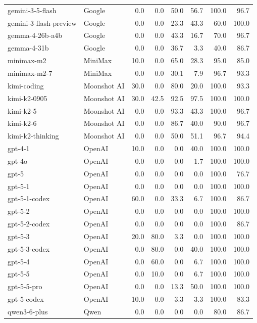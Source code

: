 \begin{longtable}{llrrrrrr}
gemini-3-5-flash & Google & 0.0 & 0.0 & 50.0 & 56.7 & 100.0 & 96.7 \\
gemini-3-flash-preview & Google & 0.0 & 0.0 & 23.3 & 43.3 & 60.0 & 100.0 \\
gemma-4-26b-a4b & Google & 0.0 & 0.0 & 43.3 & 16.7 & 70.0 & 96.7 \\
gemma-4-31b & Google & 0.0 & 0.0 & 36.7 & 3.3 & 40.0 & 86.7 \\
minimax-m2 & MiniMax & 10.0 & 0.0 & 65.0 & 28.3 & 95.0 & 85.0 \\
minimax-m2-7 & MiniMax & 0.0 & 0.0 & 30.1 & 7.9 & 96.7 & 93.3 \\
kimi-coding & Moonshot AI & 30.0 & 0.0 & 80.0 & 20.0 & 100.0 & 93.3 \\
kimi-k2-0905 & Moonshot AI & 30.0 & 42.5 & 92.5 & 97.5 & 100.0 & 100.0 \\
kimi-k2-5 & Moonshot AI & 0.0 & 0.0 & 93.3 & 43.3 & 100.0 & 96.7 \\
kimi-k2-6 & Moonshot AI & 0.0 & 0.0 & 86.7 & 40.0 & 90.0 & 96.7 \\
kimi-k2-thinking & Moonshot AI & 0.0 & 0.0 & 50.0 & 51.1 & 96.7 & 94.4 \\
gpt-4-1 & OpenAI & 10.0 & 0.0 & 0.0 & 40.0 & 100.0 & 100.0 \\
gpt-4o & OpenAI & 0.0 & 0.0 & 0.0 & 1.7 & 100.0 & 100.0 \\
gpt-5 & OpenAI & 0.0 & 0.0 & 0.0 & 0.0 & 100.0 & 76.7 \\
gpt-5-1 & OpenAI & 0.0 & 0.0 & 0.0 & 0.0 & 100.0 & 100.0 \\
gpt-5-1-codex & OpenAI & 60.0 & 0.0 & 33.3 & 6.7 & 100.0 & 86.7 \\
gpt-5-2 & OpenAI & 0.0 & 0.0 & 0.0 & 0.0 & 100.0 & 100.0 \\
gpt-5-2-codex & OpenAI & 0.0 & 0.0 & 0.0 & 0.0 & 100.0 & 86.7 \\
gpt-5-3 & OpenAI & 20.0 & 80.0 & 3.3 & 0.0 & 100.0 & 100.0 \\
gpt-5-3-codex & OpenAI & 0.0 & 80.0 & 0.0 & 40.0 & 100.0 & 100.0 \\
gpt-5-4 & OpenAI & 0.0 & 60.0 & 0.0 & 6.7 & 100.0 & 100.0 \\
gpt-5-5 & OpenAI & 0.0 & 10.0 & 0.0 & 6.7 & 100.0 & 100.0 \\
gpt-5-5-pro & OpenAI & 0.0 & 0.0 & 13.3 & 50.0 & 100.0 & 100.0 \\
gpt-5-codex & OpenAI & 10.0 & 0.0 & 3.3 & 3.3 & 100.0 & 83.3 \\
qwen3-6-plus & Qwen & 0.0 & 0.0 & 0.0 & 0.0 & 80.0 & 86.7 \\

\end{longtable}
